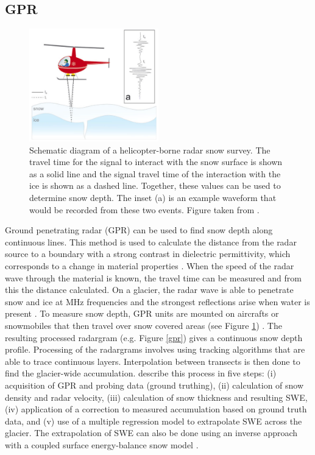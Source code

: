\documentclass[12pt]{article}
\begin{document}
\subsection{GPR}
\begin{figure}
 \centering
      \includegraphics[width=0.5\textwidth]{gpr_air.png}
  \caption{Schematic diagram of a helicopter-borne radar snow survey. The travel time for the signal to interact with the snow surface is shown as a solid line and the signal travel time of the interaction with the ice is shown as a dashed line. Together, these values can be used to determine snow depth. The inset (a) is an example waveform that would be recorded from these two events. Figure taken from \cite{Gusmeroli2014}.}
        \label{gprair}
\end{figure}

Ground penetrating radar (GPR) can be used to find snow depth along continuous lines. This method is used to calculate the distance from the radar source to a boundary with a strong contrast in dielectric permittivity, which corresponds to a change in material properties \citep{Sold2013}. When the speed of the radar wave through the material is known, the travel time can be measured and from this the distance calculated. On a glacier, the radar wave is able to penetrate snow and ice at MHz frequencies and the strongest reflections arise when water is present \citep{Sold2013}. To measure snow depth, GPR units are mounted on aircrafts or snowmobiles that then travel over snow covered areas (see Figure \ref{gprair}) \citep{Machguth2006, McGrath2015}. The resulting processed radargram (e.g. Figure \ref{gpr}) gives a continuous snow depth profile. Processing of the radargrams involves using tracking algorithms that are able to trace continuous layers. Interpolation between transects is then done to find the glacier-wide accumulation. \cite{McGrath2015} describe this process in five steps: (i) acquisition of GPR and probing data (ground truthing), (ii) calculation of snow density and radar velocity, (iii) calculation of snow thickness and resulting SWE, (iv) application of a correction to measured accumulation based on ground truth data, and (v) use of a multiple regression model to extrapolate SWE across the glacier. The extrapolation of SWE can also be done using an inverse approach with a coupled surface energy-balance snow model \citep{Pelt2014}.
\end{document}
